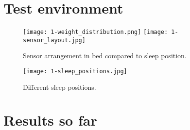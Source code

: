 \section{Test environment}

\begin{figure}[h]
  \begin{center}
    \texttt{[image: 1-weight\_distribution.png]}
    \texttt{[image: 1-sensor\_layout.jpg]}
  \end{center}
  \caption{Sensor arrangement in bed compared to sleep position.}
  \label{fig:sensor-layout}
\end{figure}

\begin{figure}[h]
  \begin{center}
    \texttt{[image: 1-sleep\_positions.jpg]}
  \end{center}
  \caption{Different sleep positions.}
  \label{fig:sleep_positions}
\end{figure}


\section{Results so far}


